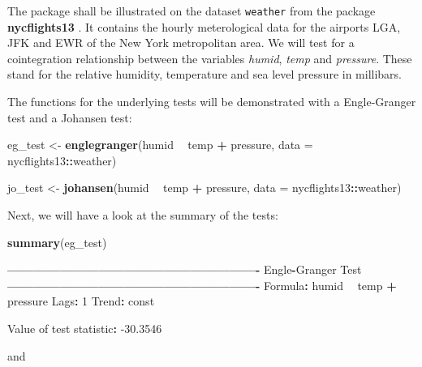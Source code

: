 \documentclass[11pt,a4paper]{article}
\newenvironment{Shaded}{\begin{snugshade}}{\end{snugshade}}
\newcommand{\DataTypeTok}[1]{\textcolor[rgb]{0.13,0.29,0.53}{#1}}
\newcommand{\DecValTok}[1]{\textcolor[rgb]{0.00,0.00,0.81}{#1}}
\newcommand{\FloatTok}[1]{\textcolor[rgb]{0.00,0.00,0.81}{#1}}
\newcommand{\KeywordTok}[1]{\textcolor[rgb]{0.13,0.29,0.53}{\textbf{#1}}}
\newcommand{\NormalTok}[1]{#1}
\newcommand{\OperatorTok}[1]{\textcolor[rgb]{0.81,0.36,0.00}{\textbf{#1}}}
\newcommand{\StringTok}[1]{\textcolor[rgb]{0.31,0.60,0.02}{#1}}
\begin{document}
The package shall be illustrated on the dataset \texttt{weather} from
the package \textbf{nycflights13} \autocite{wickham_nycflights13_2020}.
It contains the hourly meterological data for the airports LGA, JFK and
EWR of the New York metropolitan area. We will test for a cointegration
relationship between the variables \emph{humid}, \emph{temp} and
\emph{pressure}. These stand for the relative humidity, temperature and
sea level pressure in millibars.

The functions for the underlying tests will be demonstrated with a
Engle-Granger test and a Johansen test:

\begin{Shaded}
\begin{Highlighting}[]
\NormalTok{eg_test <-}\StringTok{ }\KeywordTok{englegranger}\NormalTok{(humid }\OperatorTok{~}\StringTok{ }\NormalTok{temp }\OperatorTok{+}\StringTok{ }\NormalTok{pressure,}
                        \DataTypeTok{data =}\NormalTok{ nycflights13}\OperatorTok{::}\NormalTok{weather)}

\NormalTok{jo_test <-}\StringTok{ }\KeywordTok{johansen}\NormalTok{(humid }\OperatorTok{~}\StringTok{ }\NormalTok{temp }\OperatorTok{+}\StringTok{ }\NormalTok{pressure, }
                    \DataTypeTok{data =}\NormalTok{ nycflights13}\OperatorTok{::}\NormalTok{weather)}
\end{Highlighting}
\end{Shaded}

Next, we will have a look at the summary of the tests:

\begin{Shaded}
\begin{Highlighting}[]
\KeywordTok{summary}\NormalTok{(eg_test)}

\OperatorTok{----------------------------------------------------------}
\NormalTok{Engle}\OperatorTok{-}\NormalTok{Granger Test}
\OperatorTok{----------------------------------------------------------}
\NormalTok{Formula}\OperatorTok{:}\StringTok{ }\NormalTok{humid }\OperatorTok{~}\StringTok{ }\NormalTok{temp }\OperatorTok{+}\StringTok{ }\NormalTok{pressure}
\NormalTok{Lags}\OperatorTok{:}\StringTok{ }\DecValTok{1}
\NormalTok{Trend}\OperatorTok{:}\StringTok{ }\NormalTok{const}
 
\NormalTok{Value of test statistic}\OperatorTok{:}\StringTok{ }\FloatTok{-30.3546}
\end{Highlighting}
\end{Shaded}

and
\end{document}

